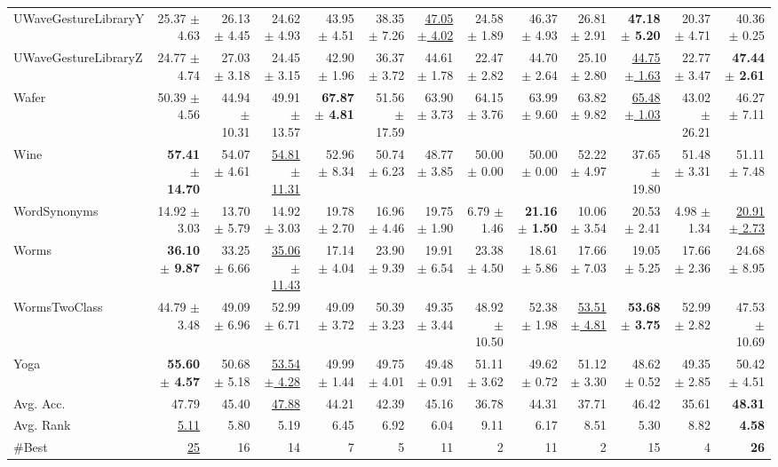 \begin{landscape}
\begin{longtable}{lrrrrrrrrrrrr}
UWaveGestureLibraryY & 25.37 $\pm$ 4.63 & 26.13 $\pm$ 4.45 & 24.62 $\pm$ 4.93 & 43.95 $\pm$ 4.51 & 38.35 $\pm$ 7.26 & \underline{47.05 $\pm$ 4.02} & 24.58 $\pm$ 1.89 & 46.37 $\pm$ 4.93 & 26.81 $\pm$ 2.91 & \textbf{47.18 $\pm$ 5.20} & 20.37 $\pm$ 4.71 & 40.36 $\pm$ 0.25 \\
UWaveGestureLibraryZ & 24.77 $\pm$ 4.74 & 27.03 $\pm$ 3.18 & 24.45 $\pm$ 3.15 & 42.90 $\pm$ 1.96 & 36.37 $\pm$ 3.72 & 44.61 $\pm$ 1.78 & 22.47 $\pm$ 2.82 & 44.70 $\pm$ 2.64 & 25.10 $\pm$ 2.80 & \underline{44.75 $\pm$ 1.63} & 22.77 $\pm$ 3.47 & \textbf{47.44 $\pm$ 2.61} \\
Wafer & 50.39 $\pm$ 4.56 & 44.94 $\pm$ 10.31 & 49.91 $\pm$ 13.57 & \textbf{67.87 $\pm$ 4.81} & 51.56 $\pm$ 17.59 & 63.90 $\pm$ 3.73 & 64.15 $\pm$ 3.76 & 63.99 $\pm$ 9.60 & 63.82 $\pm$ 9.82 & \underline{65.48 $\pm$ 1.03} & 43.02 $\pm$ 26.21 & 46.27 $\pm$ 7.11 \\
Wine & \textbf{57.41 $\pm$ 14.70} & 54.07 $\pm$ 4.61 & \underline{54.81 $\pm$ 11.31} & 52.96 $\pm$ 8.34 & 50.74 $\pm$ 6.23 & 48.77 $\pm$ 3.85 & 50.00 $\pm$ 0.00 & 50.00 $\pm$ 0.00 & 52.22 $\pm$ 4.97 & 37.65 $\pm$ 19.80 & 51.48 $\pm$ 3.31 & 51.11 $\pm$ 7.48 \\
WordSynonyms & 14.92 $\pm$ 3.03 & 13.70 $\pm$ 5.79 & 14.92 $\pm$ 3.03 & 19.78 $\pm$ 2.70 & 16.96 $\pm$ 4.46 & 19.75 $\pm$ 1.90 & 6.79 $\pm$ 1.46 & \textbf{21.16 $\pm$ 1.50} & 10.06 $\pm$ 3.54 & 20.53 $\pm$ 2.41 & 4.98 $\pm$ 1.34 & \underline{20.91 $\pm$ 2.73} \\
Worms & \textbf{36.10 $\pm$ 9.87} & 33.25 $\pm$ 6.66 & \underline{35.06 $\pm$ 11.43} & 17.14 $\pm$ 4.04 & 23.90 $\pm$ 9.39 & 19.91 $\pm$ 6.54 & 23.38 $\pm$ 4.50 & 18.61 $\pm$ 5.86 & 17.66 $\pm$ 7.03 & 19.05 $\pm$ 5.25 & 17.66 $\pm$ 2.36 & 24.68 $\pm$ 8.95 \\
WormsTwoClass & 44.79 $\pm$ 3.48 & 49.09 $\pm$ 6.96 & 52.99 $\pm$ 6.71 & 49.09 $\pm$ 3.72 & 50.39 $\pm$ 3.23 & 49.35 $\pm$ 3.44 & 48.92 $\pm$ 10.50 & 52.38 $\pm$ 1.98 & \underline{53.51 $\pm$ 4.81} & \textbf{53.68 $\pm$ 3.75} & 52.99 $\pm$ 2.82 & 47.53 $\pm$ 10.69 \\
Yoga & \textbf{55.60 $\pm$ 4.57} & 50.68 $\pm$ 5.18 & \underline{53.54 $\pm$ 4.28} & 49.99 $\pm$ 1.44 & 49.75 $\pm$ 4.01 & 49.48 $\pm$ 0.91 & 51.11 $\pm$ 3.62 & 49.62 $\pm$ 0.72 & 51.12 $\pm$ 3.30 & 48.62 $\pm$ 0.52 & 49.35 $\pm$ 2.85 & 50.42 $\pm$ 4.51 \\
\midrule
Avg. Acc. & 47.79 & 45.40 & \underline{47.88} & 44.21 & 42.39 & 45.16 & 36.78 & 44.31 & 37.71 & 46.42 & 35.61 & \textbf{48.31} \\
Avg. Rank & \underline{5.11} & 5.80 & 5.19 & 6.45 & 6.92 & 6.04 & 9.11 & 6.17 & 8.51 & 5.30 & 8.82 & \textbf{4.58} \\
\#Best & \underline{25} & 16 & 14 & 7 & 5 & 11 & 2 & 11 & 2 & 15 & 4 & \textbf{26} \\
\end{longtable}
\endgroup
\end{landscape}
